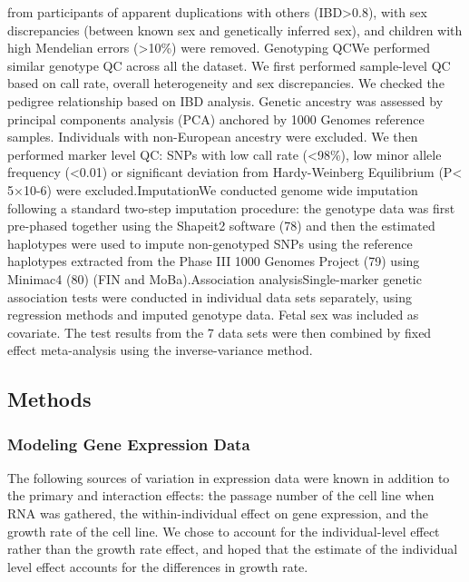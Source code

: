 from participants of apparent duplications with others (IBD>0.8), with sex discrepancies (between known sex and genetically inferred sex), and children with high Mendelian errors (>10\%) were removed. Genotyping QCWe performed similar genotype QC across all the dataset. We first performed sample-level QC based on call rate, overall heterogeneity and sex discrepancies. We checked the pedigree relationship based on IBD analysis. Genetic ancestry was assessed by principal components analysis (PCA) anchored by 1000 Genomes reference samples. Individuals with non-European ancestry were excluded. We then performed marker level QC: SNPs with low call rate (<98\%), low minor allele frequency (<0.01) or significant deviation from Hardy-Weinberg Equilibrium (P< 5×10-6) were excluded.ImputationWe conducted genome wide imputation following a standard two-step imputation procedure: the genotype data was first pre-phased together using the Shapeit2 software (78) and then the estimated haplotypes were used to impute non-genotyped SNPs using the reference haplotypes extracted from the Phase III 1000 Genomes Project (79) using Minimac4 (80) (FIN and MoBa).Association analysisSingle-marker genetic association tests were conducted in individual data sets separately, using regression methods and imputed genotype data. Fetal sex was included as covariate. The test results from the 7 data sets were then combined by fixed effect meta-analysis using the inverse-variance method.





\subsection{Methods}\label{sec:org53944c4}


\subsubsection{Modeling Gene Expression Data}\label{sec:orgc908098}

The following sources of variation in expression data were known in addition to the primary and interaction effects: the passage number of the cell line when RNA was gathered,
the within-individual effect on gene expression, and the growth rate of the cell line.  We chose to account for the individual-level effect rather than the growth rate effect, and hoped that the estimate of the individual level effect accounts for the differences in growth rate. 

